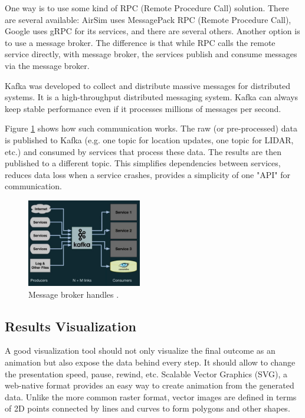 \documentclass{article}
\begin{document}
One way is to use some kind of RPC (Remote Procedure Call) solution. There are several available: AirSim uses MessagePack RPC (Remote Procedure Call), Google uses gRPC for its services, and there are several others. Another option is to use a message broker. The difference is that while RPC calls the remote service directly, with message broker, the services publish and consume messages via the message broker.

Kafka was developed to collect and distribute massive messages for distributed systems. It is a high-throughput distributed messaging system. Kafka can always keep stable performance even if it processes millions of messages per second. \cite{wang2015kafka}

Figure \ref{fig:after-kafka} shows how such communication works. The raw (or pre-processed) data is published to Kafka (e.g. one topic for location updates, one topic for LIDAR, etc.) and consumed by services that process these data. The results are then published to a different topic. This simplifies dependencies between services, reduces data loss when a service crashes, provides a simplicity of one "API" for communication.



\begin{figure}
	\centering
	\includegraphics[width=5cm]{after-kafka}
	\caption{Message broker handles  .}\label{fig:after-kafka}
\end{figure}

\subsection{Results Visualization}
A good visualization tool should not only visualize the final outcome as an animation but also expose the data behind every step. It should allow to change the presentation speed, pause, rewind, etc.  Scalable Vector Graphics (SVG), a web-native format provides an easy way to create animation from the generated data. Unlike the more common raster format, vector images are defined in terms of 2D points connected by lines and curves to form polygons and other shapes. \cite{basicShapes}
\end{document}
